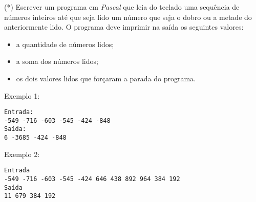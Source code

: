 \item (*) Escrever um programa em \emph{Pascal} que leia do teclado
uma sequência de números inteiros até que seja lido um número
que seja o dobro ou a metade do anteriormente lido.
O programa deve imprimir na saída os seguintes valores:
\begin{itemize}
\item a quantidade de números lidos;
\item a soma dos números lidos;
\item os dois valores lidos que forçaram a parada do programa.
\end{itemize}

Exemplo 1:
\begin{verbatim}
Entrada:
-549 -716 -603 -545 -424 -848
Saída:
6 -3685 -424 -848
\end{verbatim}

Exemplo 2:
\begin{verbatim}
Entrada
-549 -716 -603 -545 -424 646 438 892 964 384 192
Saída
11 679 384 192
\end{verbatim}